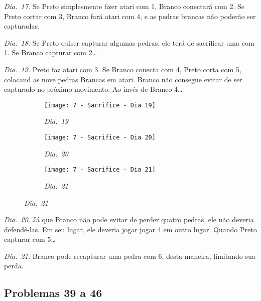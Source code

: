 \emph{Dia.\@~17.} Se Preto simplesmente fizer atari com 1, Branco conectará com 2. Se Preto cortar com 3, Branco fará atari com 4, e as pedras brancas não poderão ser capturadas.

\emph{Dia.\@~18.} Se Preto quiser capturar algumas pedras, ele terá de sacrificar uma com 1. Se Branco capturar com 2\ldots

\emph{Dia.\@~19.} Preto faz atari com 3. Se Branco conecta com 4, Preto corta com 5, colocand as nove pedras Brancas em atari. Branco não consegue evitar de ser capturado no próximo movimento. Ao invés de Branco 4\ldots

\begin{figure}[h!]
    \centering
    \begin{subfigure}[t]{.31\textwidth}
        \texttt{[image: 7 - Sacrifice - Dia 19]}
        \caption*{\emph{Dia.\@~19}}
    \end{subfigure}
    \hfill
    \begin{subfigure}[t]{.31\textwidth}
        \texttt{[image: 7 - Sacrifice - Dia 20]}
        \caption*{\emph{Dia.\@~20}}
    \end{subfigure}
    \hfill
    \begin{subfigure}[t]{.31\textwidth}
        \texttt{[image: 7 - Sacrifice - Dia 21]}
        \caption*{\emph{Dia.\@~21}}
    \end{subfigure}
\end{figure}

\emph{Dia.\@~20.} Já que Branco não pode evitar de perder quatro pedras, ele não deveria defendê-las. Em seu lugar, ele deveria jogar jogar 4 em outro lugar. Quando Preto capturar com 5\ldots

\emph{Dia.\@~21.} Branco pode recapturar uma pedra com 6, desta maneira, limitando sua perda.

\pagebreak

\subsection{Problemas 39 a 46}

